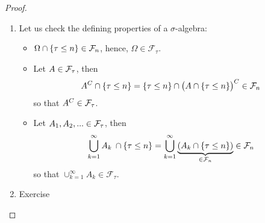 \begin{proof}[Proof]
\begin{enumerate}[label=(\roman*)]
\item Let us check the defining properties of a $\sigma$-algebra:
	\begin{itemize}
		\item
			$\Omega \cap \lbrace \tau \leq n \rbrace \in \mathcal{F}_n$, hence, $\Omega \in \mathcal F_\tau$.
		\item
			Let $A \in \mathcal{F}_{\tau}$, then \[ A^C \cap \lbrace \tau \leq n \rbrace = \lbrace \tau \leq n \rbrace \cap \big( A \cap \lbrace \tau \leq n \rbrace \big)^C \in \mathcal{F}_n \]
			so that $A^C\in \mathcal{F}_\tau$.		
		\item
			Let $A_1,A_2,... \in \mathcal{F}_{\tau}$, then
				\[ \bigcup\limits_{k=1}^{\infty}A_k \: \cap \lbrace \tau \leq n \rbrace = \bigcup\limits_{k=1}^{\infty} \underbrace{\left(A_k \cap \lbrace \tau \leq n \rbrace\right)}_{\in \mathcal{F}_n}\in\mathcal{F}_n \]
			so that $\cup_{k=1}^\infty A_k\in \mathcal F_\tau$.
	\end{itemize}
\item Exercise

\end{enumerate}
\end{proof}


